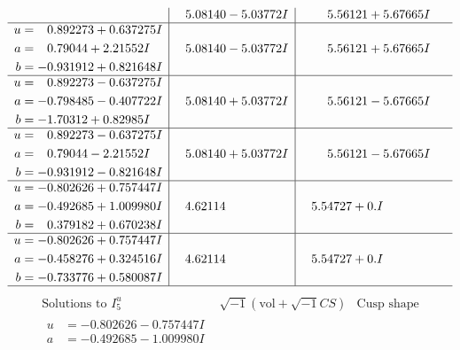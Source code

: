 \documentclass[1p]{elsarticle_modified}
\theoremstyle{definition}
\newcommand{\I}{\sqrt{-1}}
\begin{document}
$$\begin{array}{c|c|c}
 & \phantom{-}5.08140 - 5.03772 I & \phantom{-}5.56121 + 5.67665 I \\ \hline\begin{aligned}
u &= \phantom{-}0.892273 + 0.637275 I \\
a &= \phantom{-}0.79044 + 2.21552 I \\
b &= -0.931912 + 0.821648 I\end{aligned}
 & \phantom{-}5.08140 - 5.03772 I & \phantom{-}5.56121 + 5.67665 I \\ \hline\begin{aligned}
u &= \phantom{-}0.892273 - 0.637275 I \\
a &= -0.798485 - 0.407722 I \\
b &= -1.70312 + 0.82985 I\end{aligned}
 & \phantom{-}5.08140 + 5.03772 I & \phantom{-}5.56121 - 5.67665 I \\ \hline\begin{aligned}
u &= \phantom{-}0.892273 - 0.637275 I \\
a &= \phantom{-}0.79044 - 2.21552 I \\
b &= -0.931912 - 0.821648 I\end{aligned}
 & \phantom{-}5.08140 + 5.03772 I & \phantom{-}5.56121 - 5.67665 I \\ \hline\begin{aligned}
u &= -0.802626 + 0.757447 I \\
a &= -0.492685 + 1.009980 I \\
b &= \phantom{-}0.379182 + 0.670238 I\end{aligned}
 & \phantom{-}4.62114\phantom{ +0.000000I} & \phantom{-}5.54727 + 0. I\phantom{ +0.000000I} \\ \hline\begin{aligned}
u &= -0.802626 + 0.757447 I \\
a &= -0.458276 + 0.324516 I \\
b &= -0.733776 + 0.580087 I\end{aligned}
 & \phantom{-}4.62114\phantom{ +0.000000I} & \phantom{-}5.54727 + 0. I\phantom{ +0.000000I}\\
 \hline 
 \end{array}$$\newpage$$\begin{array}{c|c|c}  
\text{Solutions to }I^u_{5}& \I (\text{vol} + \sqrt{-1}CS) & \text{Cusp shape}\\
 \hline 
\begin{aligned}
u &= -0.802626 - 0.757447 I \\
a &= -0.492685 - 1.009980 I \\

\end{aligned}
\end{array}$$
\end{document}
